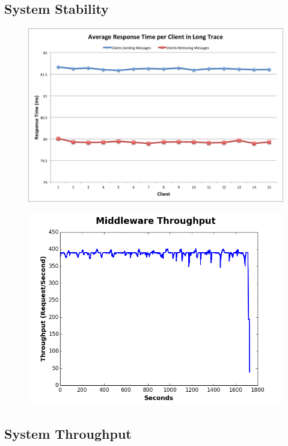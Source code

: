 \subsection{System Stability}\label{sec:system-stability}

\begin{figure}[h!]
	\centering
	\includegraphics[scale=0.35]{stabilityRP.png}
	\caption{}
	\label{stabilityRP}
\end{figure}
\begin{figure}[h!]
	\centering
	\includegraphics[scale=0.45]{stabilityTHR.png}
	\caption{}
	\label{stabilityTHR}
\end{figure}
\subsection{System Throughput}\label{sec:system-throughput}


